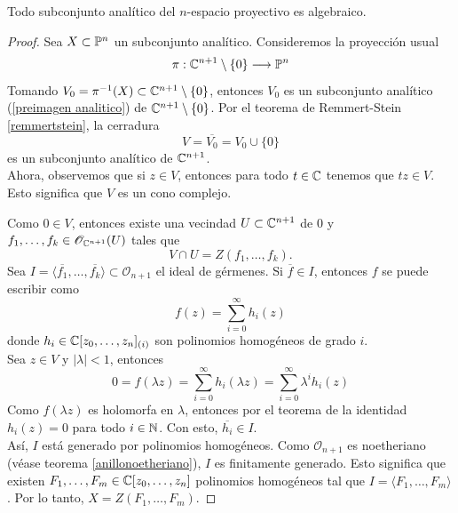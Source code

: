 \begin{theorem}
	Todo subconjunto analítico del $n$-espacio proyectivo es algebraico.
\end{theorem}
	\begin{proof}\parencite{chirka}
		Sea $X\subset \mathbb{P}^n$ un subconjunto analítico. Consideremos la proyección usual
		\begin{align*}
			\pi:\mathbb{C}^{n+1}\setminus\{0\}\longrightarrow \mathbb{P}^n
		\end{align*}
		Tomando $V_0=\pi^{-1}(X)\subset \mathbb{C}^{n+1}\setminus\{0\}$, entonces $V_0$ es un subconjunto analítico (\ref{preimagen analitico}) de $\mathbb{C}^{n+1}\setminus\{0\}$. Por el teorema de Remmert-Stein \ref{remmertstein}, la cerradura 
		\begin{equation*}
			V=\overline{V_0}=V_0\cup\{0\}
		\end{equation*}
		es un subconjunto analítico de $\mathbb{C}^{n+1}$.\\
		Ahora, observemos que  si $z\in V$, entonces para todo $t\in\mathbb{C}$ tenemos que $tz\in V$. Esto significa que $V$ es un cono complejo.
		
		Como $0\in V$, entonces existe una vecindad $U\subset\mathbb{C}^{n+1}$ de $0$ y $f_1,\dots,f_k\in\mathscr{O}_{\mathbb{C}^{n+1}}(U)$ tales que 
		\begin{equation*}
			V\cap U=Z(f_1,\dots,f_k).
		\end{equation*}
		Sea $I=\langle \overline{f_1},\dots,\overline{f_k} \rangle\subset \mathscr{O}_{n+1}$ el ideal de gérmenes. Si $\overline{f}\in I$, entonces $f$ se puede escribir como 
		\begin{equation*}
			f(z)=\sum_{i=0}^{\infty}h_i(z)
		\end{equation*}
		donde $h_i\in\mathbb{C}[z_0,\dots,z_n]_{(i)}$ son polinomios homogéneos de grado $i$.\\
		Sea $z\in V$ y $|\lambda|<1$, entonces 
		\begin{equation*}
			0=f(\lambda z)=\sum_{i=0}^{\infty}h_i(\lambda z)=\sum_{i=0}^{\infty}\lambda^ih_i( z)
		\end{equation*}
		Como $f(\lambda z)$ es holomorfa en $\lambda$, entonces por el teorema de la identidad $h_i(z)=0$ para todo $i\in\mathbb{N}$. Con esto, $\overline{h_i}\in I$.\\
		Así, $I$ está generado por polinomios homogéneos. Como $\mathscr{O}_{n+1}$ es noetheriano (véase teorema \ref{anillonoetheriano}), $I$ es finitamente generado. Esto significa que existen $F_1,\dots, F_m\in\mathbb{C}[z_0,\dots,z_n]$ polinomios homogéneos tal que $I=\langle F_1,\dots, F_m \rangle$.
		Por lo tanto, $X=Z(F_1,\dots,F_m)$.
	\end{proof}
	
